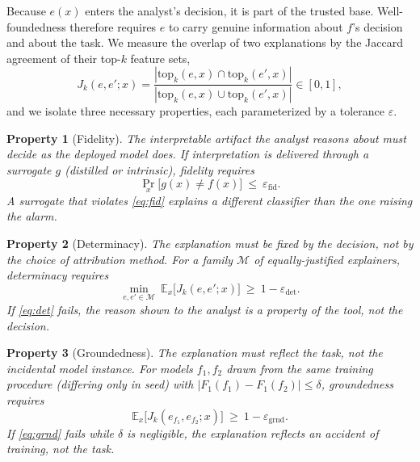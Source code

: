 \documentclass[conference]{IEEEtran}
\newtheorem{property}{Property}
\begin{document}
Because $e(x)$ enters the analyst's decision, it is part of the trusted base. Well-foundedness
therefore requires $e$ to carry genuine information about $f$'s decision and about the task. We
measure the overlap of two explanations by the Jaccard agreement of their top-$k$ feature sets,
\begin{equation}
J_k(e,e';x)=\frac{|\mathrm{top}_k(e,x)\cap\mathrm{top}_k(e',x)|}
{|\mathrm{top}_k(e,x)\cup\mathrm{top}_k(e',x)|}\in[0,1],
\label{eq:jac}
\end{equation}
and we isolate three necessary properties, each parameterized by a tolerance $\varepsilon$.

\begin{property}[Fidelity]\label{p:fid}
The interpretable artifact the analyst reasons about must decide as the deployed model does. If
interpretation is delivered through a surrogate $g$ (distilled or intrinsic), fidelity requires
\begin{equation}
\Pr_{x}\!\big[g(x)\neq f(x)\big]\ \le\ \varepsilon_{\mathrm{fid}} .
\label{eq:fid}
\end{equation}
A surrogate that violates \eqref{eq:fid} explains a different classifier than the one raising the
alarm.
\end{property}

\begin{property}[Determinacy]\label{p:det}
The explanation must be fixed by the decision, not by the choice of attribution method. For a
family $\mathcal{M}$ of equally-justified explainers, determinacy requires
\begin{equation}
\min_{e,e'\in\mathcal{M}}\ \mathbb{E}_{x}\big[J_k(e,e';x)\big]\ \ge\ 1-\varepsilon_{\mathrm{det}} .
\label{eq:det}
\end{equation}
If \eqref{eq:det} fails, the reason shown to the analyst is a property of the tool, not the
decision.
\end{property}

\begin{property}[Groundedness]\label{p:grnd}
The explanation must reflect the task, not the incidental model instance. For models
$f_1,f_2$ drawn from the same training procedure (differing only in seed) with
$|F_1(f_1)-F_1(f_2)|\le\delta$, groundedness requires
\begin{equation}
\mathbb{E}_{x}\big[J_k(e_{f_1},e_{f_2};x)\big]\ \ge\ 1-\varepsilon_{\mathrm{grnd}} .
\label{eq:grnd}
\end{equation}
If \eqref{eq:grnd} fails while $\delta$ is negligible, the explanation reflects an accident of
training, not the task.
\end{property}
\end{document}
